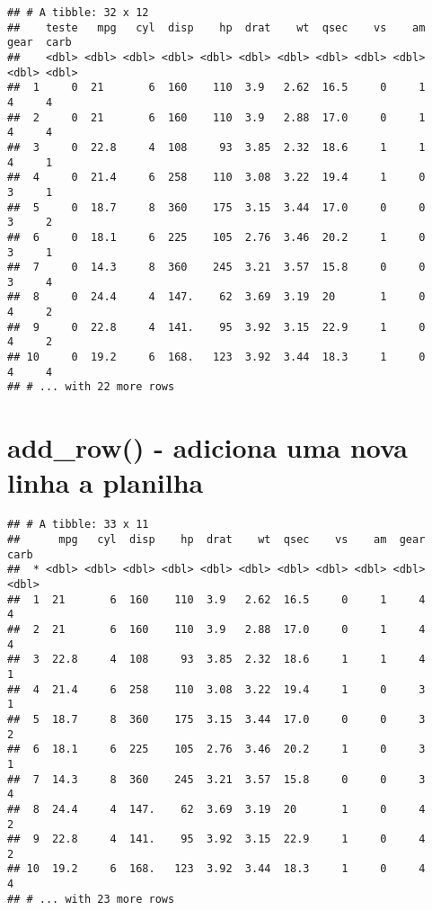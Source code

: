 \documentclass[]{book}
\newenvironment{Shaded}{\begin{snugshade}}{\end{snugshade}}
\newcommand{\KeywordTok}[1]{\textcolor[rgb]{0.13,0.29,0.53}{\textbf{#1}}}
\newcommand{\NormalTok}[1]{#1}
\newcommand{\OperatorTok}[1]{\textcolor[rgb]{0.81,0.36,0.00}{\textbf{#1}}}
\newcommand{\StringTok}[1]{\textcolor[rgb]{0.31,0.60,0.02}{#1}}
\begin{document}
\begin{verbatim}
## # A tibble: 32 x 12
##    teste   mpg   cyl  disp    hp  drat    wt  qsec    vs    am  gear  carb
##    <dbl> <dbl> <dbl> <dbl> <dbl> <dbl> <dbl> <dbl> <dbl> <dbl> <dbl> <dbl>
##  1     0  21       6  160    110  3.9   2.62  16.5     0     1     4     4
##  2     0  21       6  160    110  3.9   2.88  17.0     0     1     4     4
##  3     0  22.8     4  108     93  3.85  2.32  18.6     1     1     4     1
##  4     0  21.4     6  258    110  3.08  3.22  19.4     1     0     3     1
##  5     0  18.7     8  360    175  3.15  3.44  17.0     0     0     3     2
##  6     0  18.1     6  225    105  2.76  3.46  20.2     1     0     3     1
##  7     0  14.3     8  360    245  3.21  3.57  15.8     0     0     3     4
##  8     0  24.4     4  147.    62  3.69  3.19  20       1     0     4     2
##  9     0  22.8     4  141.    95  3.92  3.15  22.9     1     0     4     2
## 10     0  19.2     6  168.   123  3.92  3.44  18.3     1     0     4     4
## # ... with 22 more rows
\end{verbatim}

\hypertarget{add_row---adiciona-uma-nova-linha-a-planilha}{%
\section{add\_row() - adiciona uma nova linha a planilha}\label{add_row---adiciona-uma-nova-linha-a-planilha}}

\begin{Shaded}
\end{Shaded}

\begin{verbatim}
## # A tibble: 33 x 11
##      mpg   cyl  disp    hp  drat    wt  qsec    vs    am  gear  carb
##  * <dbl> <dbl> <dbl> <dbl> <dbl> <dbl> <dbl> <dbl> <dbl> <dbl> <dbl>
##  1  21       6  160    110  3.9   2.62  16.5     0     1     4     4
##  2  21       6  160    110  3.9   2.88  17.0     0     1     4     4
##  3  22.8     4  108     93  3.85  2.32  18.6     1     1     4     1
##  4  21.4     6  258    110  3.08  3.22  19.4     1     0     3     1
##  5  18.7     8  360    175  3.15  3.44  17.0     0     0     3     2
##  6  18.1     6  225    105  2.76  3.46  20.2     1     0     3     1
##  7  14.3     8  360    245  3.21  3.57  15.8     0     0     3     4
##  8  24.4     4  147.    62  3.69  3.19  20       1     0     4     2
##  9  22.8     4  141.    95  3.92  3.15  22.9     1     0     4     2
## 10  19.2     6  168.   123  3.92  3.44  18.3     1     0     4     4
## # ... with 23 more rows
\end{verbatim}
\end{document}
